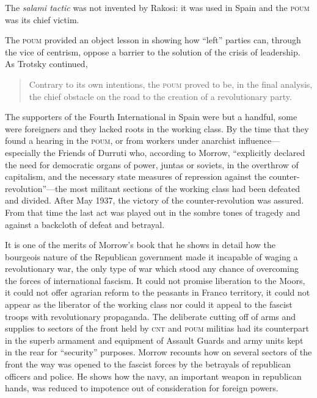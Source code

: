 The \emph{salami tactic} was not invented by Rakosi: it was used in Spain and the \textsc{poum} was its chief victim.

The \textsc{poum} provided an object lesson in showing how ``left'' parties can, through the vice of centrism, oppose a barrier to the solution of the crisis of leadership. As Trotsky continued,
\begin{quotation}
  Contrary to its own intentions, the \textsc{poum} proved to be, in the final analysis, the chief obstacle on the road to the creation of a revolutionary party.
\end{quotation}

The supporters of the Fourth International in Spain were but a handful, some were foreigners and they lacked roots in the working class. By the time that they found a hearing in the \textsc{poum}, or from workers under anarchist influence---especially the Friends of Durruti who, according to Morrow, ``explicitly declared the need for democratic organs of power, juntas or soviets, in the overthrow of capitalism, and the necessary state measures of repression against the counter-revolution''---the most militant sections of the working class had been defeated and divided. After May 1937, the victory of the counter-revolution was assured. From that time the last act was played out in the sombre tones of tragedy and against a backcloth of defeat and betrayal.

It is one of the merits of Morrow’s book that he shows in detail how the bourgeois nature of the Republican government made it incapable of waging a revolutionary war, the only type of war which stood any chance of overcoming the forces of international fascism. It could not promise liberation to the Moors, it could not offer agrarian reform to the peasants in Franco territory, it could not appear as the liberator of the working class nor could it appeal to the fascist troops with revolutionary propaganda. The deliberate cutting off of arms and supplies to sectors of the front held by \textsc{cnt} and \textsc{poum} militias had its counterpart in the superb armament and equipment of Assault Guards and army units kept in the rear for ``security'' purposes. Morrow recounts how on several sectors of the front the way was opened to the fascist forces by the betrayals of republican officers and police. He shows how the navy, an important weapon in republican hands, was reduced to impotence out of consideration for foreign powers.

